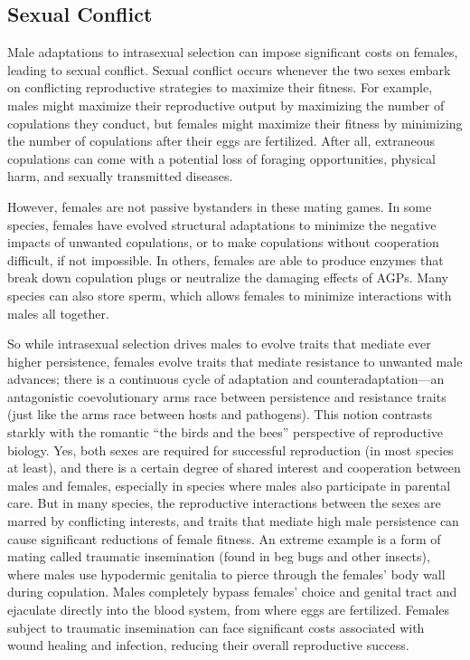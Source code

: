 \documentclass[
]{book}
\begin{document}
\hypertarget{sexual-conflict}{%
\subsection{Sexual Conflict}\label{sexual-conflict}}

Male adaptations to intrasexual selection can impose significant costs on females, leading to sexual conflict. Sexual conflict occurs whenever the two sexes embark on conflicting reproductive strategies to maximize their fitness. For example, males might maximize their reproductive output by maximizing the number of copulations they conduct, but females might maximize their fitness by minimizing the number of copulations after their eggs are fertilized. After all, extraneous copulations can come with a potential loss of foraging opportunities, physical harm, and sexually transmitted diseases.

However, females are not passive bystanders in these mating games. In some species, females have evolved structural adaptations to minimize the negative impacts of unwanted copulations, or to make copulations without cooperation difficult, if not impossible. In others, females are able to produce enzymes that break down copulation plugs or neutralize the damaging effects of AGPs. Many species can also store sperm, which allows females to minimize interactions with males all together.

So while intrasexual selection drives males to evolve traits that mediate ever higher persistence, females evolve traits that mediate resistance to unwanted male advances; there is a continuous cycle of adaptation and counteradaptation---an antagonistic coevolutionary arms race between persistence and resistance traits (just like the arms race between hosts and pathogens). This notion contrasts starkly with the romantic ``the birds and the bees'' perspective of reproductive biology. Yes, both sexes are required for successful reproduction (in most species at least), and there is a certain degree of shared interest and cooperation between males and females, especially in species where males also participate in parental care. But in many species, the reproductive interactions between the sexes are marred by conflicting interests, and traits that mediate high male persistence can cause significant reductions of female fitness. An extreme example is a form of mating called traumatic insemination (found in beg bugs and other insects), where males use hypodermic genitalia to pierce through the females' body wall during copulation. Males completely bypass females' choice and genital tract and ejaculate directly into the blood system, from where eggs are fertilized. Females subject to traumatic insemination can face significant costs associated with wound healing and infection, reducing their overall reproductive success.
\end{document}
